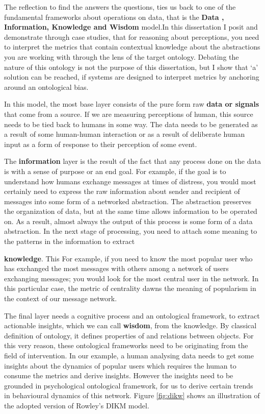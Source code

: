 The reflection to find the answers the questions, ties us back to one of the fundamental frameworks about operations on data, that is the \textbf{Data , Information, Knowledge and Wisdom} model\cite{rowley2007wisdom}.In this dissertation I posit and demonstrate through case studies, that for reasoning about perceptions, you need to interpret the metrics that contain contextual knowledge about the abstractions you are working with through the lens of the target ontology. Debating the nature of this ontology is not the purpose of this dissertation, but I show that `a' solution can be reached, if systems are designed to interpret metrics by anchoring around an ontological bias.

In this model, the most base layer consists of the pure form raw \textbf{data or signals} that come from a source. If we are measuring perceptions of human, this source needs to be tied back to humans in some way. The data needs to be generated as a result of some human-human interaction or as a result of deliberate human input as a form of response to their perception of some event. 

The \textbf{information} layer is the result of the fact that any process done on the data is with a sense of purpose or an end goal. For example, if the goal is to understand how humans exchange messages at times of distress, you would most certainly need to express the raw information about sender and recipient of messages into some form of a networked abstraction. The abstraction preserves the organization of data, but at the same time allows information to be operated on. As a result, almost always the output of this process is some form of a data abstraction. In the next stage of processing, you need to attach some meaning to the patterns in the information to extract 

\textbf{knowledge}. This  For example, if you need to know the most popular user who has exchanged the most messages with others among a network of users exchanging messages; you would look for the most central user in the network. In this particular case, the metric of centrality dawns the meaning of popularism in the context of our message network. 

The final layer needs a cognitive process and an ontological framework, to extract actionable insights, which we can call \textbf{wisdom}, from the knowledge. By classical definition of ontology, it defines properties of and relations between objects. For this very reason, these ontological frameworks need to be originating from the field of intervention.  In our example, a human analysing data needs to get some insights about the dynamics of popular users which requires the human to consume the metrics and derive insights. However the insights need to be grounded in psychological ontological framework, for us to derive certain trends in behavioural dynamics of this network.  Figure \ref{fig:dikw} shows an illustration of the adopted version of Rowley's DIKM model. 


